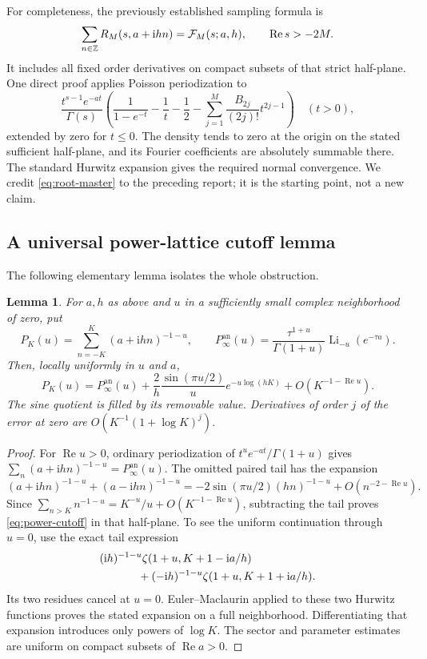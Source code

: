 \documentclass[11pt,letterpaper]{article}
\numberwithin{equation}{section}
\newtheorem{lemma}[theorem]{Lemma}
\theoremstyle{definition}
\theoremstyle{remark}
\DeclareMathOperator{\Li}{Li}
\DeclareMathOperator{\Ree}{Re}
\newcommand{\ii}{\mathrm i}
\begin{document}
For completeness, the previously established sampling formula is
\begin{equation}\label{eq:root-master}
 \sum_{n\in\mathbb Z}R_M(s,a+\ii hn)={\cal F}_M(s;a,h),
 \qquad \Ree s>-2M.
\end{equation}
It includes all fixed order derivatives on compact subsets of that
strict half-plane. One direct proof applies Poisson periodization to
\[
 \frac{t^{s-1}e^{-at}}{\Gamma(s)}
 \left(\frac1{1-e^{-t}}-\frac1t-\frac12
       -\sum_{j=1}^{M}\frac{B_{2j}}{(2j)!}t^{2j-1}\right)
 \quad(t>0),
\]
extended by zero for \(t\leq0\). The density tends to zero at the
origin on the stated sufficient half-plane, and its
Fourier coefficients are absolutely summable there. The standard
Hurwitz expansion \cite[Section 25.11]{DLMF} gives the required
normal convergence. We credit \eqref{eq:root-master} to the preceding
report; it is the starting point, not a new claim.

\subsection{A universal power-lattice cutoff lemma}

The following elementary lemma isolates the whole obstruction.

\begin{lemma}\label{lem:power-cutoff}
For \(a,h\) as above and \(u\) in a sufficiently small complex
neighborhood of zero, put
\[
 P_K(u)=\sum_{n=-K}^{K}(a+\ii hn)^{-1-u},\qquad
 P_\infty^{\mathrm{an}}(u)=
       \frac{\tau^{1+u}}{\Gamma(1+u)}\Li_{-u}(e^{-\tau a}).
\]
Then, locally uniformly in \(u\) and \(a\),
\begin{equation}\label{eq:power-cutoff}
 P_K(u)=P_\infty^{\mathrm{an}}(u)
    +\frac{2}{h}\frac{\sin(\pi u/2)}{u}
                   e^{-u\log(hK)}
    +O\!\left(K^{-1-\Ree u}\right).
\end{equation}
The sine quotient is filled by its removable value. Derivatives of
order \(j\) of the error at zero are
\(O(K^{-1}(1+\log K)^j)\).
\end{lemma}

\begin{proof}
For \(\Ree u>0\), ordinary periodization of
\(t^u e^{-at}/\Gamma(1+u)\) gives
\(\sum_n(a+\ii hn)^{-1-u}=P_\infty^{\mathrm{an}}(u)\).
The omitted paired tail has the expansion
\[
 (a+\ii hn)^{-1-u}+(a-\ii hn)^{-1-u}
 =-2\sin(\pi u/2)(hn)^{-1-u}+O(n^{-2-\Ree u}).
\]
Since
\(\sum_{n>K}n^{-1-u}=K^{-u}/u+O(K^{-1-\Ree u})\),
subtracting the tail proves \eqref{eq:power-cutoff} in that half-plane.
To see the uniform continuation through \(u=0\), use the exact tail
expression
\begin{align*}
 &( \ii h)^{-1-u}\zeta(1+u,K+1-\ii a/h)\\
 &\hspace{12mm}
 +(-\ii h)^{-1-u}\zeta(1+u,K+1+\ii a/h).
\end{align*}
Its two residues cancel at \(u=0\). Euler--Maclaurin applied to
these two Hurwitz functions proves the stated expansion on a full
neighborhood. Differentiating that expansion introduces only powers
of \(\log K\). The sector and parameter estimates are uniform on
compact subsets of \(\Ree a>0\).
\end{proof}
\end{document}
